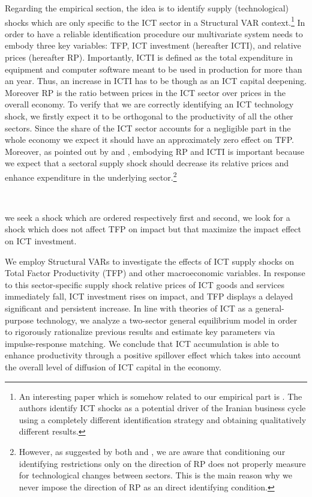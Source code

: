 \documentclass[14pt]{article}
\begin{document}
Regarding the empirical section, the idea is to identify supply (technological) shocks which are only specific to the ICT sector in a Structural VAR context.\footnote{An interesting paper which is somehow related to our empirical part is \cite{jafari2012impact}. The authors identify ICT shocks as a potential driver of the Iranian business cycle using a completely different identification strategy and obtaining qualitatively different results.} In order to have a reliable identification procedure our multivariate system needs to embody three key variables: TFP, ICT investment (hereafter ICTI), and relative prices (hereafter RP). Importantly, ICTI is defined as the total expenditure in equipment and computer software meant to be used in production for more than an year. Thus, an increase in ICTI has to be though as an ICT capital deepening. Moreover RP is the ratio between prices in the ICT sector over prices in the overall economy. To verify that we are correctly identifying an ICT technology shock, we firstly expect it to be orthogonal to the productivity of all the other sectors. Since the share of the ICT sector accounts for a negligible part in the whole economy we expect it should have an approximately zero effect on TFP. Moreover, as pointed out by \cite{greenwood1997long} and \cite{fisher2006dynamic}, embodying RP and ICTI is important because we expect that a sectoral supply shock should decrease its relative prices and enhance expenditure in the underlying sector.\footnote{However, as suggested by both \cite{greenwood2000role} and \cite{basu2010sector}, we are aware that conditioning our identifying restrictions only on the direction of RP does not properly measure for technological changes between sectors. This is the main reason why we never impose the direction of RP as an direct identifying condition.} 

\




 we seek a shock which are ordered respectively first and second, we look for a shock which does not affect TFP on impact but that maximize the impact effect on ICT investment.

We employ Structural VARs to investigate the effects of ICT supply shocks on Total Factor Productivity (TFP) and other macroeconomic variables. In response to this sector-specific supply shock relative prices of ICT goods and services immediately fall, ICT investment rises on impact, and TFP displays a delayed significant and persistent increase. In line with theories of ICT as a general-purpose technology, we analyze a two-sector general equilibrium model in order to rigorously rationalize previous results and estimate key parameters via impulse-response matching. We conclude that ICT accumulation is able to enhance productivity through a positive spillover effect which takes into account the overall level of diffusion of ICT capital in the economy.
\end{document}
